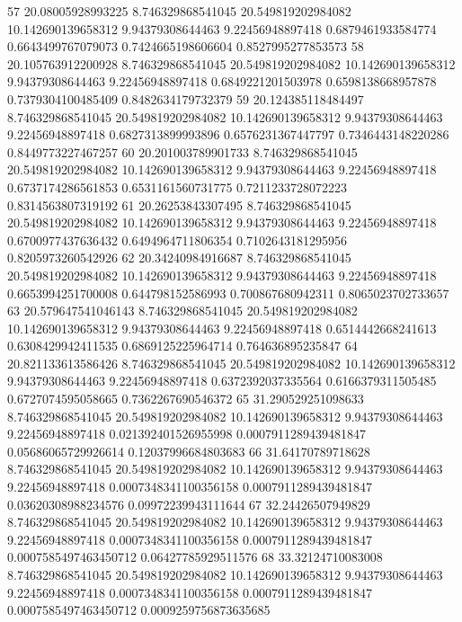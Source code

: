 {57 20.08005928993225 8.746329868541045 20.549819202984082 10.142690139658312 9.94379308644463 9.22456948897418 0.6879461933584774 0.6643499767079073 0.7424665198606604 0.8527995277853573
58 20.105763912200928 8.746329868541045 20.549819202984082 10.142690139658312 9.94379308644463 9.22456948897418 0.6849221201503978 0.6598138668957878 0.7379304100485409 0.8482634179732379
59 20.124385118484497 8.746329868541045 20.549819202984082 10.142690139658312 9.94379308644463 9.22456948897418 0.6827313899993896 0.6576231367447797 0.7346443148220286 0.8449773227467257
60 20.201003789901733 8.746329868541045 20.549819202984082 10.142690139658312 9.94379308644463 9.22456948897418 0.6737174286561853 0.6531161560731775 0.7211233728072223 0.8314563807319192
61 20.26253843307495 8.746329868541045 20.549819202984082 10.142690139658312 9.94379308644463 9.22456948897418 0.6700977437636432 0.6494964711806354 0.7102643181295956 0.8205973260542926
62 20.34240984916687 8.746329868541045 20.549819202984082 10.142690139658312 9.94379308644463 9.22456948897418 0.6653994251700008 0.644798152586993 0.700867680942311 0.8065023702733657
63 20.579647541046143 8.746329868541045 20.549819202984082 10.142690139658312 9.94379308644463 9.22456948897418 0.6514442668241613 0.6308429942411535 0.6869125225964714 0.764636895235847
64 20.821133613586426 8.746329868541045 20.549819202984082 10.142690139658312 9.94379308644463 9.22456948897418 0.6372392037335564 0.6166379311505485 0.6727074595058665 0.7362267690546372
65 31.290529251098633 8.746329868541045 20.549819202984082 10.142690139658312 9.94379308644463 9.22456948897418 0.021392401526955998 0.0007911289439481847 0.05686065729926614 0.12037996684803683
66 31.64170789718628 8.746329868541045 20.549819202984082 10.142690139658312 9.94379308644463 9.22456948897418 0.0007348341100356158 0.0007911289439481847 0.03620308988234576 0.09972239943111644
67 32.24426507949829 8.746329868541045 20.549819202984082 10.142690139658312 9.94379308644463 9.22456948897418 0.0007348341100356158 0.0007911289439481847 0.0007585497463450712 0.06427785929511576
68 33.32124710083008 8.746329868541045 20.549819202984082 10.142690139658312 9.94379308644463 9.22456948897418 0.0007348341100356158 0.0007911289439481847 0.0007585497463450712 0.0009259756873635685
}\tableexpivwaittwittnet
